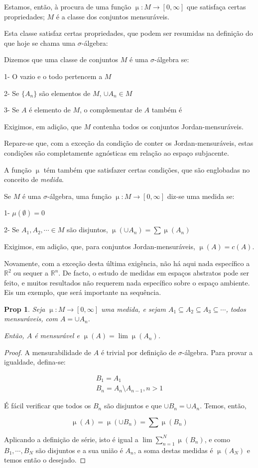 \documentclass{article}
\newtheorem{prop}{Prop}
\newcommand{\R}{\mathbb{R}}
\DeclareMathOperator{\mmu}{\mu}
\begin{document}
Estamos, então, à procura de uma função $\mmu : M \to [0, \infty]$ que satisfaça certas propriedades; $M$ é a classe dos conjuntos mensuráveis.

Esta classe satisfaz certas propriedades, que podem ser resumidas na definição do que hoje se chama uma $\sigma$-álgebra:

Dizemos que uma classe de conjuntos $M$ é uma $\sigma$-álgebra se:

1- O vazio e o todo pertencem a $M$

2- Se $\{A_n\}$ são elementos de $M$, $\cup A_n \in M$

3- Se $A$ é elemento de $M$, o complementar de $A$ também é

Exigimos, em adição, que $M$ contenha todos os conjuntos Jordan-mensuráveis.

Repare-se que, com a exceção da condição de conter os Jordan-mensuráveis, estas condições são completamente agnósticas em relação ao espaço subjacente.

A função $\mmu$ tém também que satisfazer certas condições, que são englobadas no conceito de \emph{medida}.

Se $M$ é uma $\sigma$-álgebra, uma função $\mmu : M \to [0, \infty]$ diz-se uma medida se:

1- $\mu(\emptyset) = 0$

2- Se $A_1, A_2, \cdots \in M$ são disjuntos, $\mmu(\cup A_n) = \sum \mmu(A_n)$

Exigimos, em adição, que, para conjuntos Jordan-mensuráveis, $\mmu(A) = c(A)$.

Novamente, com a exceção desta última exigência, não há aqui nada específico a $\R^2$ ou sequer a $\R^n$. De facto, o estudo de medidas em espaços abstratos pode ser feito, e muitos resultados não requerem nada específico sobre o espaço ambiente. Eis um exemplo, que será importante na sequência.

\begin{prop}
Seja $\mmu : M \to [0, \infty]$ uma medida, e sejam $A_1 \subseteq A_2 \subseteq A_3 \subseteq \cdots$, todos mensuráveis, com $A = \cup A_n$.

Então, $A$ é mensurável e $\mmu(A) = \lim \mmu(A_n)$.
\end{prop}

\begin{proof}
A mensurabilidade de $A$ é trivial por definição de $\sigma$-álgebra. Para provar a igualdade, defina-se:

\begin{gather*}
B_1 = A_1\\
B_n = A_n \setminus A_{n-1}, n > 1
\end{gather*}

É fácil verificar que todos os $B_n$ são disjuntos e que $\cup B_n = \cup A_n$. Temos, então,

\[ \mmu(A) = \mmu(\cup B_n) = \sum \mmu(B_n) \]

Aplicando a definição de série, isto é igual a $\lim \sum_{n = 1}^N \mmu(B_n)$, e como $B_1, \cdots, B_N$ são disjuntos e a sua união é $A_n$, a soma destas medidas é $\mmu(A_N)$ e temos então o desejado.
\end{proof}
\end{document}

